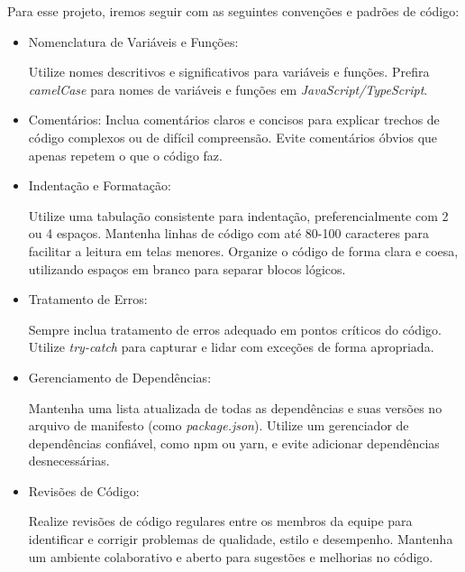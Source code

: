 Para esse projeto, iremos seguir com as seguintes convenções e padrões de código:

\begin{itemize}
    \item Nomenclatura de Variáveis e Funções:

Utilize nomes descritivos e significativos para variáveis e funções.
Prefira \textit{camelCase} para nomes de variáveis e funções em \textit{JavaScript/TypeScript}.

    \item Comentários:
Inclua comentários claros e concisos para explicar trechos de código complexos ou de difícil compreensão.
Evite comentários óbvios que apenas repetem o que o código faz.

    \item Indentação e Formatação:

Utilize uma tabulação consistente para indentação, preferencialmente com 2 ou 4 espaços.
Mantenha linhas de código com até 80-100 caracteres para facilitar a leitura em telas menores.
Organize o código de forma clara e coesa, utilizando espaços em branco para separar blocos lógicos.

    \item Tratamento de Erros:

Sempre inclua tratamento de erros adequado em pontos críticos do código.
Utilize \textit{try-catch} para capturar e lidar com exceções de forma apropriada.

    \item Gerenciamento de Dependências:

Mantenha uma lista atualizada de todas as dependências e suas versões no arquivo de manifesto (como \textit{package.json}).
Utilize um gerenciador de dependências confiável, como \acs{npm} ou \acs{yarn}, e evite adicionar dependências desnecessárias.

    \item Revisões de Código:

Realize revisões de código regulares entre os membros da equipe para identificar e corrigir problemas de qualidade, estilo e desempenho.
Mantenha um ambiente colaborativo e aberto para sugestões e melhorias no código.

\end{itemize}

\newpage

